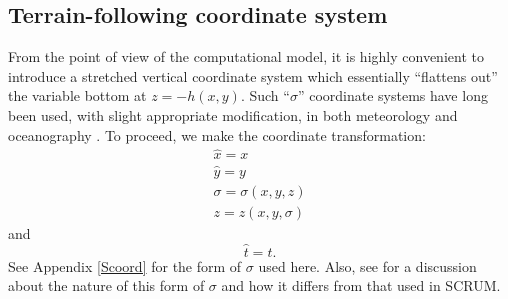 \subsection{Terrain-following coordinate system}
From the point of view of the computational model, it is highly
convenient to introduce a stretched vertical coordinate system which
essentially ``flattens out'' the variable bottom at $z = -h(x,y)$.
Such ``$\sigma$'' coordinate systems have long been used, with slight
appropriate modification, in both meteorology and oceanography
\citep[e.g.,][]{Phil,FHD}.
To proceed, we make the coordinate transformation:
\[\begin{array}{c}
  \hat{x} = x \\
  \hat{y} = y \\[1mm]
  \sigma = \sigma(x,y,z) \\[1mm]
  z = z(x,y,\sigma)
\end{array}\]
and
\[
  \hat{t} = t.
\]
See Appendix \ref{Scoord} for the form of $\sigma$ used here.
Also, see \citet{SS2005} for a
discussion about the nature of this form of $\sigma$ and how it
differs from that used in SCRUM.

